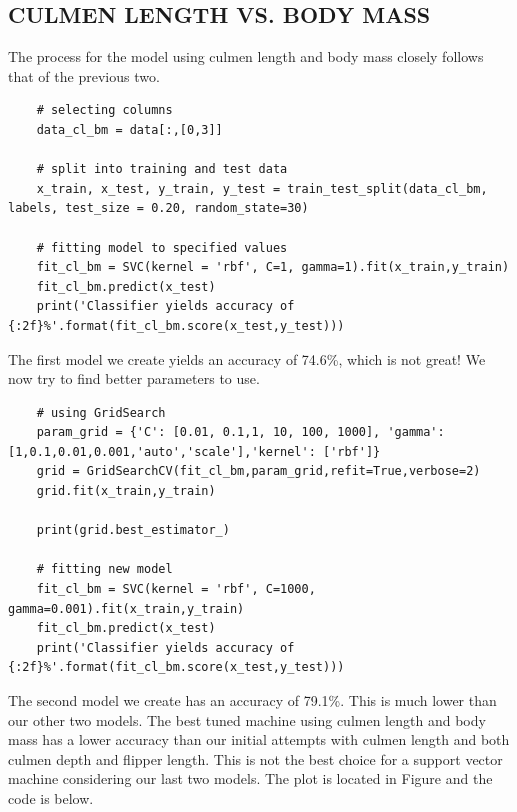 \documentclass[12pt]{article}
\begin{document}
\subsection{CULMEN LENGTH VS. BODY MASS}

The process for the model using culmen length and body mass closely follows that of the previous two.

\begin{verbatim}
    # selecting columns
    data_cl_bm = data[:,[0,3]]

    # split into training and test data
    x_train, x_test, y_train, y_test = train_test_split(data_cl_bm, labels, test_size = 0.20, random_state=30)

    # fitting model to specified values
    fit_cl_bm = SVC(kernel = 'rbf', C=1, gamma=1).fit(x_train,y_train)
    fit_cl_bm.predict(x_test)
    print('Classifier yields accuracy of {:2f}%'.format(fit_cl_bm.score(x_test,y_test)))
\end{verbatim}

The first model we create yields an accuracy of 74.6\%, which is not great! We now try to find better parameters to use.

\begin{verbatim}
    # using GridSearch
    param_grid = {'C': [0.01, 0.1,1, 10, 100, 1000], 'gamma': [1,0.1,0.01,0.001,'auto','scale'],'kernel': ['rbf']}
    grid = GridSearchCV(fit_cl_bm,param_grid,refit=True,verbose=2)
    grid.fit(x_train,y_train)

    print(grid.best_estimator_)

    # fitting new model
    fit_cl_bm = SVC(kernel = 'rbf', C=1000, gamma=0.001).fit(x_train,y_train)
    fit_cl_bm.predict(x_test)
    print('Classifier yields accuracy of {:2f}%'.format(fit_cl_bm.score(x_test,y_test)))
\end{verbatim}

The second model we create has an accuracy of 79.1\%. This is much lower than our other two models. The best tuned machine using culmen length and body mass has a lower accuracy than our initial attempts with culmen length and both culmen depth and flipper length. This is not the best choice for a support vector machine considering our last two models. The plot is located in Figure and the code is below.
\end{document}
